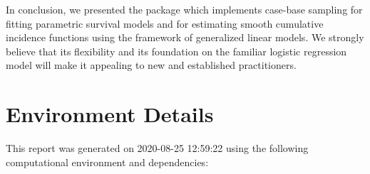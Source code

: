 \documentclass[
]{jss}
\begin{document}
In conclusion, we presented the  package 
which implements case-base sampling for fitting parametric survival
models and for estimating smooth cumulative incidence functions using
the framework of generalized linear models. We strongly believe that its
flexibility and its foundation on the familiar logistic regression model
will make it appealing to new and established practitioners.

\hypertarget{environment-details}{%
\section{Environment Details}\label{environment-details}}

This report was generated on 2020-08-25 12:59:22 using the following
computational environment and dependencies:
\end{document}
